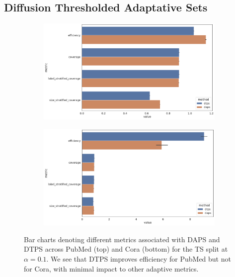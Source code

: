 \subsection{Diffusion Thresholded Adaptative Sets}
\begin{figure}
    \centering
    \begin{subfigure}{0.7\linewidth}
        \includegraphics[width=\linewidth,alt={Bar charts denoting different metrics associated with DAPS and DTPS across PubMed }]{graphConformal/figures/split/daps_dtps_pubmed.png}
    \end{subfigure}
    \begin{subfigure}{0.7\linewidth}
        \includegraphics[width=\linewidth,alt={ar charts denoting different metrics associated with DAPS and DTPS across Cora.}]{graphConformal/figures/split/daps_dtps_cora.png}
    \end{subfigure}
    \caption{Bar charts denoting different metrics associated with DAPS and DTPS across PubMed (top) and Cora (bottom) for the TS split at $\alpha=0.1$. We see that DTPS improves efficiency for PubMed but not for Cora, with minimal impact to other adaptive metrics.}
    \label{fig:fs:conformal:daps_vs_dtps}
\end{figure}


